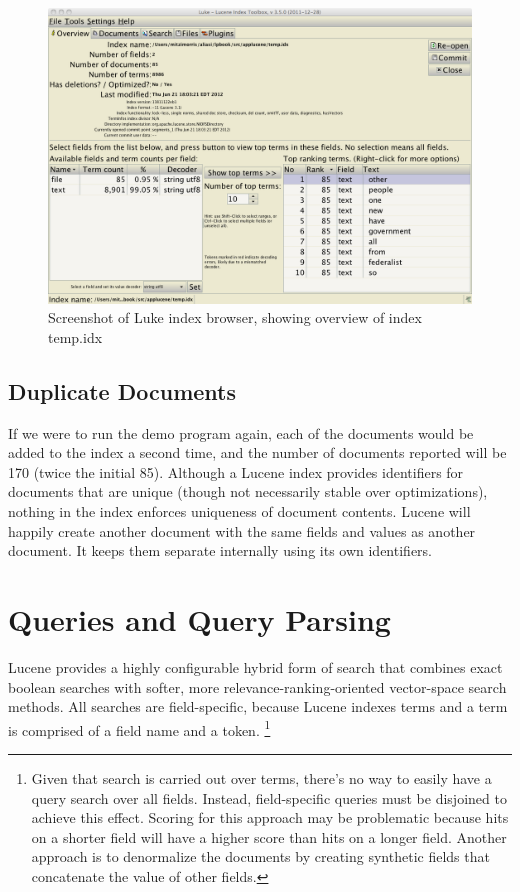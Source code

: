 \begin{figure}[!hb]
\includegraphics[width=5.0in]{pngs/luke1.png}
\vspace*{-18pt}
\caption{Screenshot of Luke index browser, showing overview of index temp.idx}
\end{figure}

\subsection{Duplicate Documents}

If we were to run the demo program again, each of the documents would
be added to the index a second time, and the number of documents
reported will be 170 (twice the initial 85).  Although a Lucene index
provides identifiers for documents that are unique (though not
necessarily stable over optimizations), nothing in the index enforces
uniqueness of document contents.  Lucene will happily create another
document with the same fields and values as another document.  It
keeps them separate internally using its own identifiers.

\section{Queries and Query Parsing}

Lucene provides a highly configurable hybrid form of search that
combines exact boolean searches with softer, more
relevance-ranking-oriented vector-space search methods.  
All searches are field-specific, because Lucene indexes terms and 
a term is comprised of a field name and a token.%
%
\footnote{Given that search is carried out over terms, 
 there's no way to easily have a query search over all fields.
 Instead, field-specific queries must be disjoined to achieve this
 effect.  Scoring for this approach may be problematic because
 hits on a shorter field  will have a higher score than hits on a longer field.
 Another approach is to denormalize the documents by creating
 synthetic fields that concatenate the value of other fields.}
%

